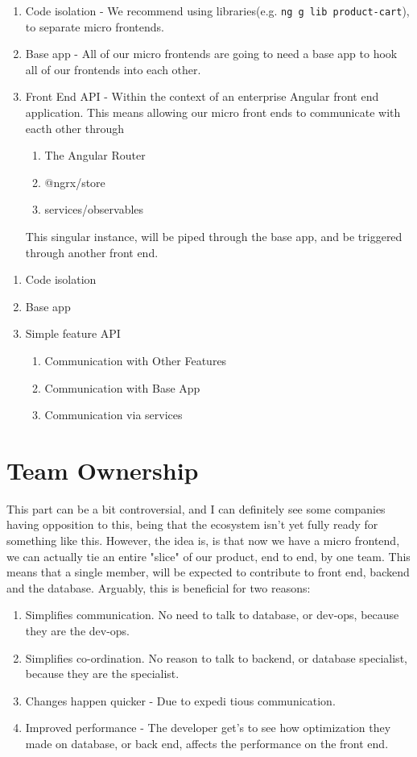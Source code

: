 \begin{enumerate}
  \item Code isolation - We recommend using libraries(e.g. \lstinline{ng g lib product-cart}), to separate micro frontends.
  \item Base app - All of our micro frontends are going to need a base app to hook all of our frontends into each other.
  \item Front End API - Within the context of an enterprise Angular front end application. This means allowing our micro front ends to communicate with eacth other through 
  \begin{enumerate}
    \item The Angular Router
    \item @ngrx/store
    \item services/observables
  \end{enumerate}
  This singular instance, will be piped through the base app, and be triggered through another front end. 
\end{enumerate} 


\begin{enumerate}
  \item Code isolation
  \item Base app
  \item Simple feature API
  \begin{enumerate}
    \item Communication with Other Features
    \item Communication with Base App
    \item Communication via services
  \end{enumerate}
\end{enumerate}

\section{Team Ownership}
This part can be a bit controversial, and I can definitely see some companies having opposition to this, being that the ecosystem isn't yet fully ready for something like this. However, the idea is, is that now we have a micro frontend, we can actually tie an entire "slice" of our product, end to end, by one team. This means that a single member, will be expected to contribute to front end, backend and the database. Arguably, this is beneficial for two reasons: 
\begin{enumerate}
  \item Simplifies communication. No need to talk to database, or dev-ops, because they are the dev-ops. 
  \item Simplifies co-ordination. No reason to talk to backend, or database specialist, because they are the specialist. 
  \item Changes happen quicker - Due to expedi  tious communication.
  \item Improved performance - The developer get's to see how optimization they made on database, or back end, affects the performance on the front end. 
\end{enumerate}

